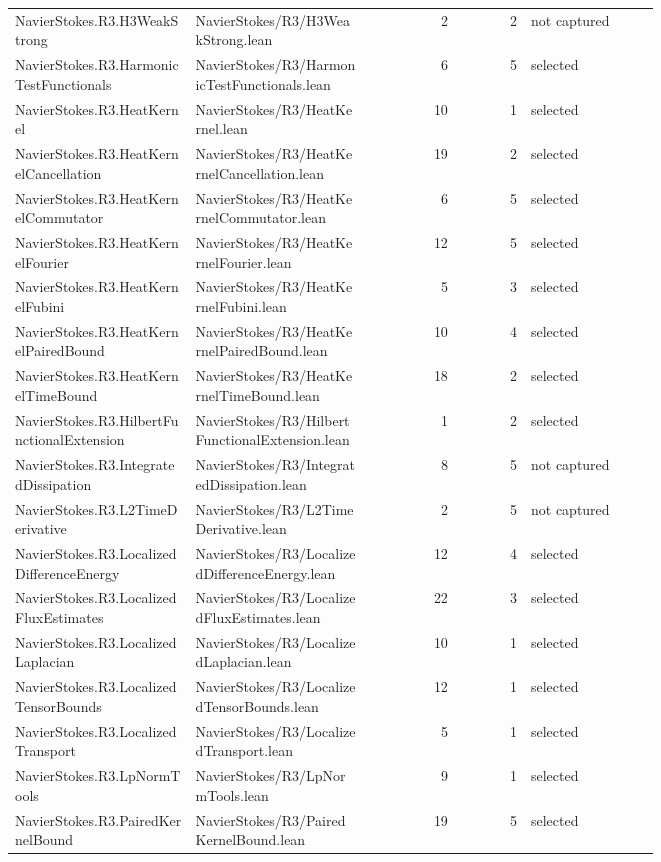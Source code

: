 \documentclass[10pt]{article}
\begin{document}
\begin{longtable}{p{0.28\linewidth}p{0.27\linewidth}r r p{0.20\linewidth}}
NavierStokes.R3.H3WeakStrong & NavierStokes/R3/H3WeakStrong.lean & 2 & 2 & not captured\\
NavierStokes.R3.HarmonicTestFunctionals & NavierStokes/R3/HarmonicTestFunctionals.lean & 6 & 5 & selected\\
NavierStokes.R3.HeatKernel & NavierStokes/R3/HeatKernel.lean & 10 & 1 & selected\\
NavierStokes.R3.HeatKernelCancellation & NavierStokes/R3/HeatKernelCancellation.lean & 19 & 2 & selected\\
NavierStokes.R3.HeatKernelCommutator & NavierStokes/R3/HeatKernelCommutator.lean & 6 & 5 & selected\\
NavierStokes.R3.HeatKernelFourier & NavierStokes/R3/HeatKernelFourier.lean & 12 & 5 & selected\\
NavierStokes.R3.HeatKernelFubini & NavierStokes/R3/HeatKernelFubini.lean & 5 & 3 & selected\\
NavierStokes.R3.HeatKernelPairedBound & NavierStokes/R3/HeatKernelPairedBound.lean & 10 & 4 & selected\\
NavierStokes.R3.HeatKernelTimeBound & NavierStokes/R3/HeatKernelTimeBound.lean & 18 & 2 & selected\\
NavierStokes.R3.HilbertFunctionalExtension & NavierStokes/R3/HilbertFunctionalExtension.lean & 1 & 2 & selected\\
NavierStokes.R3.IntegratedDissipation & NavierStokes/R3/IntegratedDissipation.lean & 8 & 5 & not captured\\
NavierStokes.R3.L2TimeDerivative & NavierStokes/R3/L2TimeDerivative.lean & 2 & 5 & not captured\\
NavierStokes.R3.LocalizedDifferenceEnergy & NavierStokes/R3/LocalizedDifferenceEnergy.lean & 12 & 4 & selected\\
NavierStokes.R3.LocalizedFluxEstimates & NavierStokes/R3/LocalizedFluxEstimates.lean & 22 & 3 & selected\\
NavierStokes.R3.LocalizedLaplacian & NavierStokes/R3/LocalizedLaplacian.lean & 10 & 1 & selected\\
NavierStokes.R3.LocalizedTensorBounds & NavierStokes/R3/LocalizedTensorBounds.lean & 12 & 1 & selected\\
NavierStokes.R3.LocalizedTransport & NavierStokes/R3/LocalizedTransport.lean & 5 & 1 & selected\\
NavierStokes.R3.LpNormTools & NavierStokes/R3/LpNormTools.lean & 9 & 1 & selected\\
NavierStokes.R3.PairedKernelBound & NavierStokes/R3/PairedKernelBound.lean & 19 & 5 & selected\\

\end{longtable}
\end{document}

